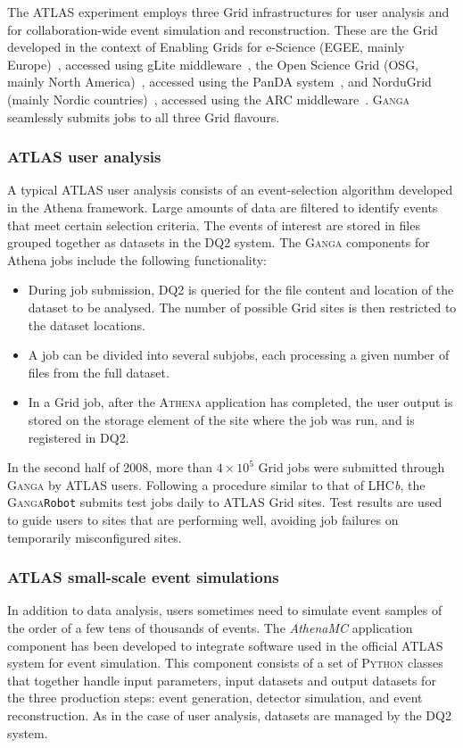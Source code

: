 \documentclass{elsart}
\def\lhcb {LHC{\em b\/}\xspace}
\def\atlas {ATLAS\xspace}
\def\ganga {\textsc{Ganga}\xspace}
\def\python {\textsc{Python}\xspace}
\def\athena {\textsc{Athena}\xspace}
\def\grid {Grid\xspace}
\def\ARC{ARC\xspace}
\newcommand{\code}[1]{\texttt{#1}}
\begin{document}
\begin{linenumbers}
The \atlas experiment employs three \grid infrastructures for user
analysis and for collaboration-wide event simulation and reconstruction. These
are the \grid developed in the context of Enabling  Grids for e-Science
(EGEE, mainly Europe)~\cite{jones_2005}, accessed using gLite
middleware~\cite{andreetto_2008}, the Open Science Grid (OSG, mainly North
America)~\cite{OSG}, accessed using the PanDA system~\cite{maeno_2008}, and
NorduGrid (mainly Nordic countries)~\cite{ellert_2003}, accessed using the
\ARC middleware~\cite{ellert_2007}.  \ganga seamlessly submits jobs to all
three \grid flavours.

\subsubsection{\atlas user analysis}
A typical \atlas user analysis consists of an event-selection algorithm
developed in the Athena framework. Large amounts of data are filtered to
identify events that meet certain selection criteria. The events of interest are
stored in files grouped together as datasets in the DQ2 system.  The \ganga
components for Athena jobs include the following functionality:
\begin{itemize}
\item During job submission, DQ2 is queried for the file content and location
of the dataset to be analysed.  The number of possible \grid sites is then
restricted to the dataset locations.
\item A job can be divided into several subjobs, each processing a given
number of files from the full dataset.
\item In a \grid job, after the \athena
application has completed, the user output 
is stored on the storage element of the site where the job was run, and is
registered in DQ2.
\end{itemize}

In the second half of 2008, more than $4 \times 10^5$ \grid jobs were submitted
through \ganga by \atlas users.  Following a procedure similar to that of
\lhcb, the \ganga \code{Robot} submits test jobs daily to \atlas \grid
sites.  Test results are used to guide users to sites that are performing
well, avoiding job failures on temporarily misconfigured sites.

\subsubsection{\atlas small-scale event simulations}
In addition to data analysis, users sometimes need to simulate event samples
of the order of a few tens of thousands of events. The \emph{AthenaMC}
application component has
been developed to integrate software used in the official \atlas system
for event simulation.  This component consists of a set of \python classes
that together handle input
parameters, input datasets and output datasets for the three
production steps: event generation, detector simulation, and
event  reconstruction. As in the case of user analysis, 
datasets are managed by
the DQ2 system.


\end{linenumbers}
\end{document}
